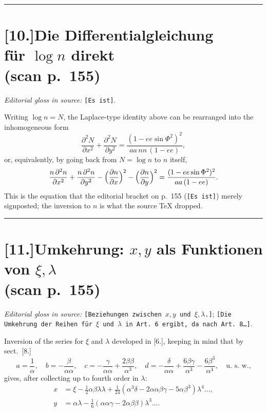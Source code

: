 \documentclass[12pt,a4paper]{article}
\begin{document}
\bigskip
\hrule
\bigskip

\section*{[10.]\quad Die Differentialgleichung\\f\"ur $\log n$ direkt\\(scan p.~155)}

\textit{Editorial gloss in source:} \texttt{[Es ist]}.

Writing $\log n = N$, the Laplace-type identity above can be rearranged
into the inhomogeneous form
\[
   \frac{\partial^{2}N}{\partial x^{2}} + \frac{\partial^{2}N}{\partial y^{2}}
     = \frac{(1-ee\sin\Phi^{2})^{2}}{aa\,nn\,(1-ee)},
\]
or, equivalently, by going back from $N=\log n$ to $n$ itself,
\[
   \frac{n\,\partial^{2}n}{\partial x^{2}}
     + \frac{n\,\partial^{2}n}{\partial y^{2}}
     - \Bigl(\frac{\partial n}{\partial x}\Bigr)^{2}
     - \Bigl(\frac{\partial n}{\partial y}\Bigr)^{2}
     = \frac{(1-ee\sin\Phi^{2})^{2}}{aa\,(1-ee)}.
\]
This is the equation that the editorial bracket on p.~155
(\texttt{[Es ist]}) merely signposted; the inversion to $n$ is what
the source TeX dropped.

\bigskip
\hrule
\bigskip

\section*{[11.]\quad Umkehrung: $x,y$ als Funktionen von $\xi,\lambda$\\(scan p.~155)}

\textit{Editorial gloss in source:} \texttt{[Beziehungen zwischen
$x,y$ und $\xi,\lambda$.]}; \texttt{[Die Umkehrung der Reihen f\"ur
$\xi$ und $\lambda$ in Art.\ 6 ergibt, da nach Art.\ 8\dots]}.

Inversion of the series for $\xi$ and $\lambda$ developed in [6.],
keeping in mind that by sect.~[8.]
\[
   a = \frac{1}{\alpha},\quad
   b = -\frac{\beta}{\alpha\alpha},\quad
   c = -\frac{\gamma}{\alpha\alpha} + \frac{2\beta\beta}{\alpha^{3}},\quad
   d = -\frac{\delta}{\alpha\alpha} + \frac{6\beta\gamma}{\alpha^{3}}
       - \frac{6\beta^{3}}{\alpha^{4}},
   \quad\text{u.~s.~w.,}
\]
gives, after collecting up to fourth order in $\lambda$:
\begin{align*}
   x &= \xi - \tfrac{1}{2}\alpha\beta\lambda\lambda
        + \tfrac{1}{24}(\alpha^{3}\delta
            - 2\alpha\alpha\beta\gamma
            - 5\alpha\beta^{3})\lambda^{4}\ldots,\\[2pt]
   y &= \alpha\lambda
        - \tfrac{1}{6}(\alpha\alpha\gamma - 2\alpha\beta\beta)\lambda^{3}\ldots.
\end{align*}
\end{document}
